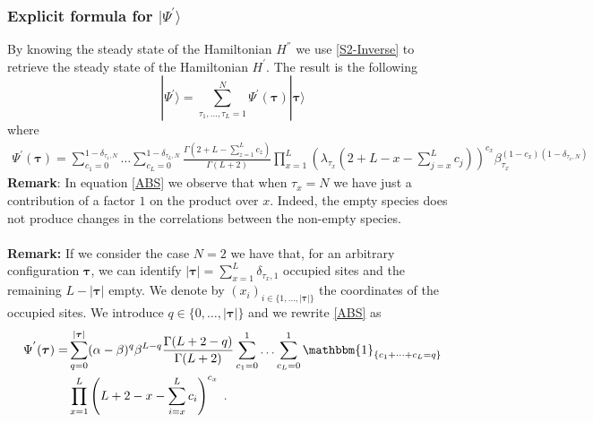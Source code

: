 \documentclass[10pt]{article}
\numberwithin{equation}{section}
\numberwithin{equation}{subsection}
\newcommand{\dt}{\;.}
\newcommand{\com}[1]{{ (* {\color{red}\small #1}*)}}
\begin{document}
\subsubsection{Explicit formula for $|\Psi^{'}\rangle$}\label{subsectionSSdual}
By knowing the steady state  of the Hamiltonian $H^{''}$ we use \eqref{S2-Inverse} to retrieve the steady state of the Hamiltonian $H^{'}$. The result is the following 
\begin{equation}\label{ABS-vect}
    |\Psi^{'}\rangle =\sum_{\tau_{1},\ldots,\tau_{L}=1}^{N}\Psi^{'}(\bm{\tau})|\bm{\tau}\rangle 
\end{equation}
where  
\begin{equation}\label{ABS}
		\begin{split}
			\Psi^{'}(\bm{\tau})=\sum_{c_{1}=0}^{1-\delta_{\tau_{1},N}}\ldots\sum_{c_{L}=0}^{1-\delta_{\tau_{L},N}}\frac{\Gamma(2+L-\sum_{z=1}^{L}c_{z})}{\Gamma(L+2)}\prod_{x=1}^{L}\left(\lambda_{\tau_{x}}\left(2+L-x-\sum_{j=x}^{L}c_{j}\right)\right)^{c_{x}}\beta_{\tau_{x}}^{(1-c_{x})(1-\delta_{\tau_{x},N})}
		\end{split}
	\end{equation} 
\textbf{Remark}: In equation \eqref{ABS} we observe that when $\tau_{x}=N$ we have just a contribution of a factor $1$ on the product over $x$. Indeed, the empty species does not produce changes in the correlations between the non-empty species. \\ \\
\textbf{Remark:} If we consider the case $N=2$ we have that, for an arbitrary configuration $\bm{\tau}$, we can identify $|\bm{\tau}|=\sum_{x=1}^{L}\delta_{\tau_{x},1}$ occupied sites and the remaining $L-|\bm{\tau}|$ empty. We denote by $(x_{i})_{i\in\{1,\ldots,|\bm{\tau}|\}}$ the coordinates of the occupied sites. We introduce $q\in\{0,\ldots,|\bm{\tau}|\}$ and we rewrite \eqref{ABS} as
\begin{align}
	\Psi^{'}(\bm{\tau})=&\sum_{q=0}^{|\bm{\tau}|}(\alpha-\beta)^{q}\beta^{L-q}\frac{\Gamma(L+2-q)}{\Gamma(L+2)}\sum_{c_{1}=0}^{1}\ldots\sum_{c_{L}=0}^{1}\mathbbm{1}_{\{c_{1}+\cdots+c_{L}=q\}}
	\\&\prod_{x=1}^{L}\left(L+2-x-\sum_{i=x}^{L}c_{i}\right)^{c_{x}}\dt
\end{align}
\end{document}
